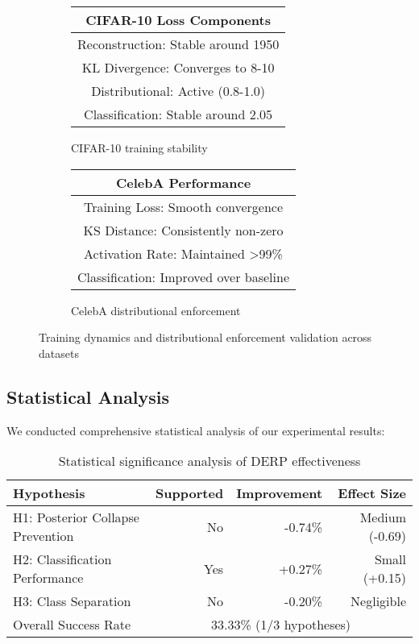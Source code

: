 \documentclass{article}
\begin{document}
\begin{figure}[h]
\centering
\begin{subfigure}{0.48\textwidth}
    \centering
    \begin{tabular}{c}
        \toprule
        \textbf{CIFAR-10 Loss Components} \\
        \midrule
        Reconstruction: Stable around 1950 \\
        KL Divergence: Converges to 8-10 \\
        Distributional: Active (0.8-1.0) \\
        Classification: Stable around 2.05 \\
        \bottomrule
    \end{tabular}
    \caption{CIFAR-10 training stability}
\end{subfigure}
\hfill
\begin{subfigure}{0.48\textwidth}
    \centering
    \begin{tabular}{c}
        \toprule
        \textbf{CelebA Performance} \\
        \midrule
        Training Loss: Smooth convergence \\
        KS Distance: Consistently non-zero \\
        Activation Rate: Maintained >99\% \\
        Classification: Improved over baseline \\
        \bottomrule
    \end{tabular}
    \caption{CelebA distributional enforcement}
\end{subfigure}
\caption{Training dynamics and distributional enforcement validation across datasets}
\label{fig:training_dynamics}
\end{figure}

\subsection{Statistical Analysis}

We conducted comprehensive statistical analysis of our experimental results:

\begin{table}[h]
\caption{Statistical significance analysis of DERP effectiveness}
\label{tab:statistical_analysis}
\centering
\begin{tabular}{lrrr}
\toprule
Hypothesis & Supported & Improvement & Effect Size \\
\midrule
H1: Posterior Collapse Prevention & No & -0.74\% & Medium (-0.69) \\
H2: Classification Performance & Yes & +0.27\% & Small (+0.15) \\
H3: Class Separation & No & -0.20\% & Negligible \\
\midrule
Overall Success Rate & \multicolumn{3}{c}{33.33\% (1/3 hypotheses)} \\
\bottomrule
\end{tabular}
\end{table}
\end{document}
